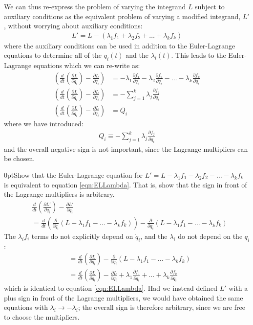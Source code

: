 We can thus re-express the problem of varying the integrand $L$ subject to auxiliary conditions as the equivalent problem of varying a modified integrand, $L'$, without worrying about auxiliary conditions:
\begin{align}
L'=L-(\lambda_1f_1+\lambda_2f_2+\dots +\lambda_kf_k)
\end{align}
where the auxiliary conditions can be used in addition to the Euler-Lagrange equations to determine all of the $q_i(t)$ and the $\lambda_i(t)$. This leads to the Euler-Lagrange equations which we can re-write as:
\begin{align}
\left(\frac{d}{dt}\left(\frac{\partial L}{\partial \dot{q}_i}\right)-\frac{\partial L}{\partial q_i}\right) &=-\lambda_1 \frac{\partial f_1}{\partial q_i}-\lambda_2\frac{\partial f_2}{\partial q_i} -\dots -\lambda_k \frac{\partial f_k}{\partial q_i}\nonumber\\
\left(\frac{d}{dt}\left(\frac{\partial L}{\partial \dot{q}_i}\right)-\frac{\partial L}{\partial q_i}\right) &=-\sum_{j=1}^k\lambda_j \frac{\partial f_j}{\partial q_i}\nonumber\\
\left(\frac{d}{dt}\left(\frac{\partial L}{\partial \dot{q}_i}\right)-\frac{\partial L}{\partial q_i}\right) &=Q_i
\label{eqn:ELLambdaQ}
\end{align}
where we have introduced:
\begin{align}
Q_i\equiv -\sum_{j=1}^k\lambda_j \frac{\partial f_j}{\partial q_i}
\end{align}
and the overall negative sign is not important, since the Lagrange multipliers can be chosen.


\begin{example}{0pt}{Show that the Euler-Lagrange equation for $L'=L-\lambda_1f_1-\lambda_2f_2-\dots -\lambda_kf_k$ is equivalent to equation \ref{eqn:ELLambda}. That is, show that the sign in front of the Lagrange multipliers is arbitrary.}{}
\begin{align*}
&\frac{d}{dt}\left(\frac{\partial L'}{\partial \dot{q}_i}\right)-\frac{\partial L'}{\partial q_i}\nonumber\\
&=\frac{d}{dt}\left(\frac{\partial}{\partial \dot{q}_i}(L-\lambda_1f_1-\dots -\lambda_kf_k)\right)-\frac{\partial}{\partial q_i}(L-\lambda_1f_1-\dots -\lambda_kf_k)\nonumber
\end{align*}
The $\lambda_if_i$ terms do not explicitly depend on $\dot{q}_i$, and the $\lambda_i$ do not depend on the $q_i$:
\begin{align*}
&=\frac{d}{dt}\left(\frac{\partial L}{\partial \dot{q}_i}\right)-\frac{\partial}{\partial q_i}(L-\lambda_1f_1-\dots -\lambda_kf_k)\nonumber\\
&=\frac{d}{dt}\left(\frac{\partial L}{\partial \dot{q}_i}\right)-\frac{\partial L}{\partial q_i}+\lambda_1\frac{\partial f_1}{\partial q_i}+\dots +\lambda_k\frac{\partial f_k}{\partial q_i}
\end{align*}
which is identical to equation \ref{eqn:ELLambda}. Had we instead defined $L'$ with a plus sign in front of the Lagrange multipliers, we would have obtained the same equations with $\lambda_i\to-\lambda_i$; the overall sign is therefore arbitrary, since we are free to choose the multipliers.
\end{example}

